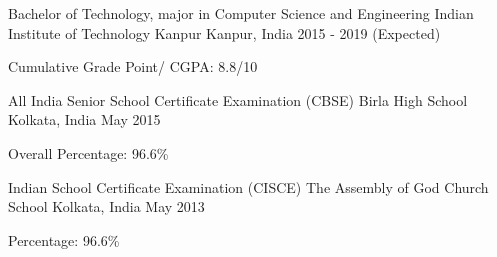 \begin{cventries}
  \cventry
    {Bachelor of Technology, major in Computer Science and Engineering}
    {Indian Institute of Technology Kanpur}
    {Kanpur, India}
    {2015 - 2019 (Expected)}
    {
      \begin{cvitems}
        \item {Cumulative Grade Point/ CGPA: 8.8/10 }
      \end{cvitems}
    }
  \cventry
    {All India Senior School Certificate Examination (CBSE)}
    {Birla High School}
    {Kolkata, India}
    {May 2015}
    {
      \begin{cvitems}
        \item {Overall Percentage: 96.6\%}
      \end{cvitems}
    }
  \cventry
    {Indian School Certificate Examination (CISCE)}
    {The Assembly of God Church School}
    {Kolkata, India}
    {May 2013}
    {
      \begin{cvitems}
        \item {Percentage: 96.6\%}
      \end{cvitems}
    }
\end{cventries}

